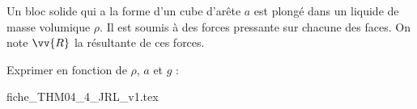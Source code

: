 

\hauteurLargeurCadreReponse		{8mm}{1.5cm}
\typeEntrainement				{} %
\initialisationEntrainement

                                \initialisationPartieGauche %
Un bloc solide qui a la forme d'un cube d'arête $a$ est plongé dans un liquide de masse volumique $\rho$. Il est soumis à des forces pressante sur chacune des faces. On note $\vv{R}$ la résultante de ces forces. 

\smallskip

Exprimer en fonction de $\rho$, $a$ et $g$ :
                                \initialisationPartieDroite %
\begin{center}
{fiche_THM04_4_JRL_v1.tex}
\end{center}
                               \finalisationDuPartageDePage %

